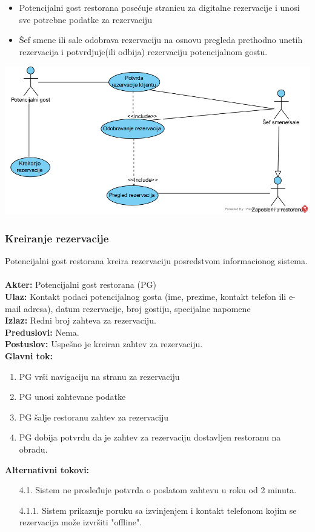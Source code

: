 \documentclass{article}
\begin{document}
\begin{itemize}
\item Potencijalni gost restorana posećuje stranicu za digitalne rezervacije i unosi sve potrebne podatke za rezervaciju
\item Šef smene ili sale odobrava rezervaciju na osnovu pregleda prethodno unetih rezervacija i potvrdjuje(ili odbija) rezervaciju potencijalnom gostu.
\end{itemize}
\vspace{1cm}
\includegraphics[width=\textwidth]{SU_5_prihvatanje_rezervacija.png}

\subsubsection{Kreiranje rezervacije}
Potencijalni gost restorana kreira rezervaciju posredstvom informacionog sistema.\\\\
\textbf{Akter:} Potencijalni gost restorana (PG)\\
\textbf{Ulaz:} Kontakt podaci potencijalnog gosta (ime, prezime, kontakt telefon ili e-mail adresa), datum rezervacije, broj gostiju, specijalne napomene\\
\textbf{Izlaz:} Redni broj zahteva za rezervaciju.\\
\textbf{Preduslovi:} Nema.\\
\textbf{Postuslov:} Uspešno je kreiran zahtev za rezervaciju.\\
\textbf{Glavni tok:}
\begin{enumerate}
\item PG vrši navigaciju na stranu za rezervaciju
\item PG unosi zahtevane podatke
\item PG šalje restoranu zahtev za rezervaciju
\item PG dobija potvrdu da je zahtev za rezervaciju dostavljen restoranu na obradu.\\
\end{enumerate}
\textbf{Alternativni tokovi:}\\
\begin{itemize}
\item [4.1.] Sistem ne prosleđuje potvrda o poslatom zahtevu u roku od 2 minuta.
\item [4.1.1.] Sistem prikazuje poruku sa izvinjenjem i kontakt telefonom kojim se rezervacija može izvršiti "offline".
\end{itemize}
\end{document}
